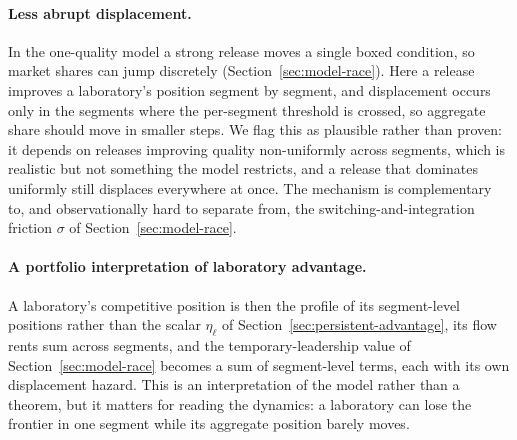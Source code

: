 \documentclass[11pt]{article}
\begin{document}
\paragraph{Less abrupt displacement.} In the one-quality model a strong release moves a single boxed condition, so market shares can jump discretely (Section~\ref{sec:model-race}). Here a release improves a laboratory's position segment by segment, and displacement occurs only in the segments where the per-segment threshold is crossed, so aggregate share should move in smaller steps. We flag this as plausible rather than proven: it depends on releases improving quality non-uniformly across segments, which is realistic but not something the model restricts, and a release that dominates uniformly still displaces everywhere at once. The mechanism is complementary to, and observationally hard to separate from, the switching-and-integration friction $\sigma$ of Section~\ref{sec:model-race}.

\paragraph{A portfolio interpretation of laboratory advantage.} A laboratory's competitive position is then the profile of its segment-level positions rather than the scalar $\eta_\ell$ of Section~\ref{sec:persistent-advantage}, its flow rents sum across segments, and the temporary-leadership value of Section~\ref{sec:model-race} becomes a sum of segment-level terms, each with its own displacement hazard. This is an interpretation of the model rather than a theorem, but it matters for reading the dynamics: a laboratory can lose the frontier in one segment while its aggregate position barely moves.
\end{document}
